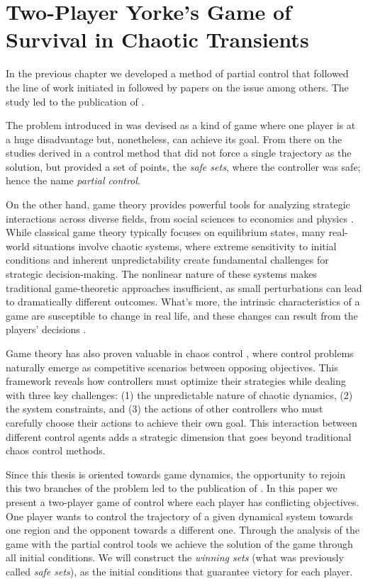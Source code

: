 \chapter{Two-Player Yorke's Game of Survival in Chaotic Transients} %
\label{chap:PartialControlGame}

In the previous chapter we developed a method of partial control that followed the line of work initiated in \cite{Yorke} followed by papers on the issue \cite{DynamicsPartialControl,PartialControlBeyond,PartialControlFunctions} among others. The study led to the publication of \cite{PartialControlEscape}. 

The problem introduced in \cite{Yorke} was devised as a kind of game where one player is at a huge disadvantage but, nonetheless, can achieve its goal. From there on the studies derived in a control method that did not force a single trajectory as the solution, but provided a set of points, the \textit{safe sets}, where the controller was safe; hence the name \textit{partial control}.

On the other hand, game theory provides powerful tools for analyzing strategic interactions across diverse fields, from social sciences to economics and physics \cite{Social,EconomyGames,GamesComplex}. While classical game theory typically focuses on equilibrium states, many real-world situations involve chaotic systems, where extreme sensitivity to initial conditions and inherent unpredictability create fundamental challenges for strategic decision-making. The nonlinear nature of these systems makes traditional game-theoretic approaches insufficient, as small perturbations can lead to dramatically different outcomes. What's more, the intrinsic characteristics of a game are susceptible to change in real life, and these changes can result from the players' decisions \cite{AkiyamaKaneko1,AkiyamaKaneko2}.

Game theory has also proven valuable in chaos control \cite{GamesControl}, where control problems naturally emerge as competitive scenarios between opposing objectives. This framework reveals how controllers must optimize their strategies while dealing with three key challenges: (1) the unpredictable nature of chaotic dynamics, (2) the system constraints, and (3) the actions of other controllers who must carefully choose their actions to achieve their own goal. This interaction between different control agents adds a strategic dimension that goes beyond traditional chaos control methods.

Since this thesis is oriented towards game dynamics, the opportunity to rejoin this two branches of the problem led to the publication of \cite{PartialControlGame}. In this paper we present a two-player game of control where each player has conflicting objectives. One player wants to control the trajectory of a given dynamical system towards one region and the opponent towards a different one. Through the analysis of the game with the partial control tools we achieve the solution of the game through all initial conditions. We will construct the \textit{winning sets} (what was previously called \textit{safe sets}), as the initial conditions that guarantee victory for each player.

